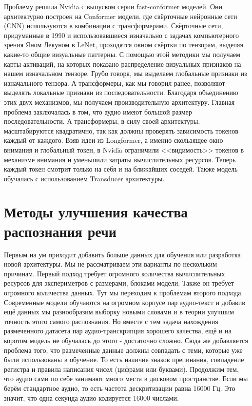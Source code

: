 Проблему решила Nvidia с выпуском серии fast-conformer моделей. 
Они архитектурно построен на Conformer модели, где свёрточные нейронные сети (CNN) используются в комбинации с трансформерами.
Свёрточные сети, придуманные в 1990 и использовавшиеся изначально с задачах компьютерного зрения Яном Лекуном в LeNet, проходятся окном свёртки по тензорам, выделяя какие-то общие визуальные паттерны.
С помощью этой методики мы получаем карты активаций, на которых показано распределение визуальных признаков на нашем изначальном тензоре.
Грубо говоря, мы выделаем глобальные признаки из изначального тензора.
А трансформеры, как мы говорил ранее, позволяют выделять локальные признаки из последовательности.
Благодаря объединению этих двух механизмов, мы получаем производительную архитектуру.
Главная проблема заключалась в том, что аудио имеют большой размер последовательности.
А трансформеры, в силу своей архитектуры, масштабируются квадратично, так как должны проверять зависимость токенов каждый от каждого.
Взяв идеи из Longformer, а именно скользящее окно внимания и глобальный токен, в Nvidia ограничили <<видимость>> токенов в механизме внимания и уменьшили затраты вычислительных ресурсов.
Теперь каждый токен смотрит только на себя и на ближайших соседей.
Также модель обучалась с использованием Transducer архитектуры.

\section{Методы улучшения качества распознания речи}
Первым на ум приходит добавить больше данных для обучения или разработка новой архитектуры.
Мы не рассматриваем эти варианты по нескольким причинам.
Первый подход требует огромного количества вычислительных ресурсов для экспериметров с размерами, блоками модели.
Также он требует огромного количества данных.
Тут мы переходим к проблемам второго подхода.
Современные модели обучаются на огромном корпусе пар аудио-текст и добавив ещё данных мы разнообразим выборку новыми словами и в теории улучшим точность этого самого распознания.
Но вместе с тем задача нахождения размеченного датасета пар аудио-транскрипция хорошего качества, ещё и на коротом модель не обучалась до этого - достаточно сложно.
Сюда же добавляется проблема того, что размеченные данные должны совпадать с теми, которые уже были использованы в обучение.
То есть наличие знаков препинания, совпадение регистра и правила написания чисел (цифрами или буквами).
Продолжим тем, что аудио сами по себе занимают много места в дисковом пространстве.
Если мы берём стандартное аудио, то есть частота дескритизации равна 16000 Гц.
Это значит, что одна секунда аудио кодируется 16000 числами.

